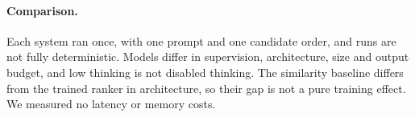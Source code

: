 \paragraph{Comparison.} Each system ran once, with one prompt and one candidate order, and runs are not fully deterministic. Models differ in supervision, architecture, size and output budget, and low thinking is not disabled thinking. The similarity baseline differs from the trained ranker in architecture, so their gap is not a pure training effect. We measured no latency or memory costs.
